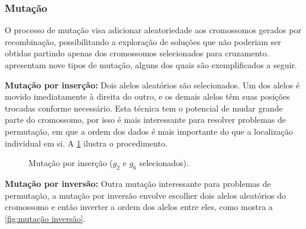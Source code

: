 \subsubsection{Mutação}

O processo de mutação visa adicionar aleatoriedade aos cromossomos gerados por recombinação, possibilitando a exploração de soluções que não poderiam ser obtidas partindo apenas dos cromossomos selecionados para cruzamento. \textcite{SONI2014} apresentam nove tipos de mutação, alguns dos quais são exemplificados a seguir.

\textbf{Mutação por inserção:} Dois alelos aleatórios são selecionados. Um dos alelos é movido imediatamente à direita do outro, e os demais alelos têm suas posições trocadas conforme necessário. Esta técnica tem o potencial de mudar grande parte do cromossomo, por isso é mais interessante para resolver problemas de permutação, em que a ordem dos dados é mais importante do que a localização individual em si. A \cref{fig:mutação inserção} ilustra o procedimento.

\begin{figure}[ht]
    \centering
    \caption{Mutação por inserção ($g_2$ e $g_6$ selecionados).}
    \label{fig:mutação inserção}
\end{figure}

\textbf{Mutação por inversão:} Outra mutação interessante para problemas de permutação, a mutação por inversão envolve escolher dois alelos aleatórios do cromossomo e então inverter a ordem dos alelos entre eles, como mostra a \cref{fig:mutação inversão}.

